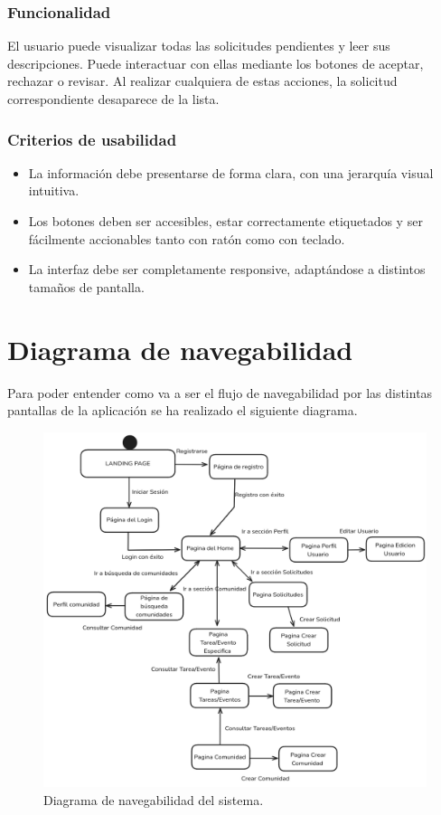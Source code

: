\subsubsection{Funcionalidad}
El usuario puede visualizar todas las solicitudes pendientes y leer sus descripciones. Puede interactuar con ellas mediante los botones de aceptar, rechazar o revisar. Al realizar cualquiera de estas acciones, la solicitud correspondiente desaparece de la lista.

\subsubsection{Criterios de usabilidad}
\begin{itemize}
  \item La información debe presentarse de forma clara, con una jerarquía visual intuitiva.
  \item Los botones deben ser accesibles, estar correctamente etiquetados y ser fácilmente accionables tanto con ratón como con teclado.
  \item La interfaz debe ser completamente responsive, adaptándose a distintos tamaños de pantalla.

\end{itemize}

\section{Diagrama de navegabilidad}
Para poder entender como va a ser el flujo de navegabilidad por las distintas pantallas de la aplicación se ha realizado el siguiente diagrama.
\begin{figure}[H]
    \centering
    \includegraphics[width=1\textwidth]{fotos/diagramaNavegabilidad.png}
    \caption{Diagrama de navegabilidad del sistema.}
    \label{fig:mapa-navegabilidad}
\end{figure}

